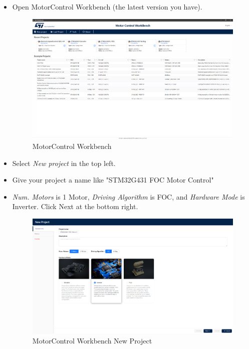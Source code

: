 \documentclass[10pt]{article}
\begin{document}
            \begin{itemize}
                \item Open MotorControl Workbench (the latest version you have). 
                    \begin{figure}[H]
                        \centerline{\includegraphics[width=\textwidth]{References/MC Workbench.png}}
                        \caption{MotorControl Workbench}
                    \end{figure}
                \item Select \emph{New project} in the top left.
                \item Give your project a name like "STM32G431 FOC Motor Control"
                \item \emph{Num. Motors} is 1 Motor, \emph{Driving Algorithm} is FOC, and \emph{Hardware Mode} is Inverter. Click Next at the bottom right.
                    \begin{figure}[H]
                        \centerline{\includegraphics[width=\textwidth]{References/MCW FOC New Project.png}}
                        \caption{MotorControl Workbench New Project}

\end{figure}
\end{itemize}
\end{document}
